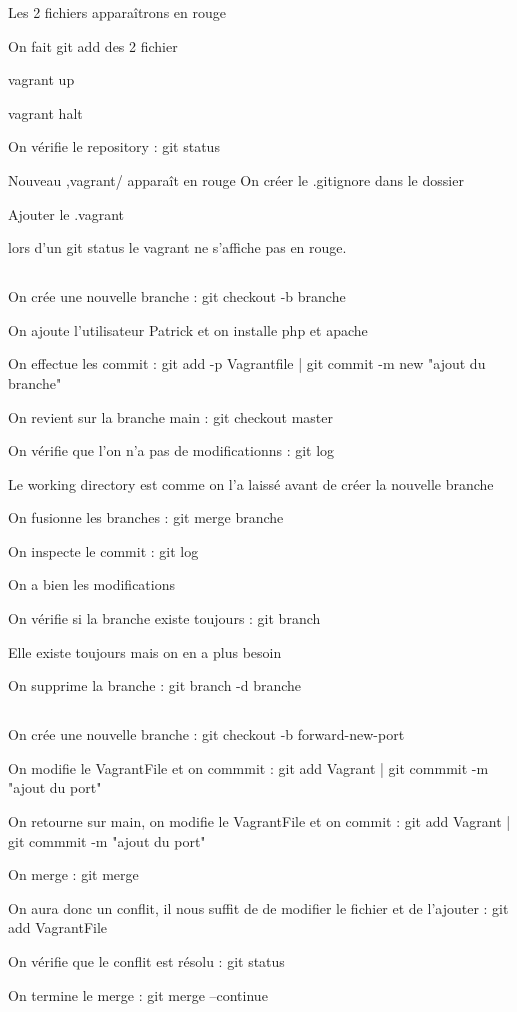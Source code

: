 \documentclass{article}
\begin{document}
Les 2 fichiers apparaîtrons en rouge

On fait git add des 2 fichier

vagrant up

vagrant halt

On vérifie le repository : git status 

Nouveau ,vagrant/ apparaît en rouge
On créer le .gitignore dans le dossier

Ajouter le .vagrant 

lors d’un git status le vagrant ne s’affiche pas en rouge.

\subsection{}

On crée une nouvelle branche : git checkout -b branche

On ajoute l'utilisateur Patrick et on installe php et apache

On effectue les commit : git add -p Vagrantfile | git commit -m new "ajout du branche"

On revient sur la branche main : git checkout master

On vérifie que l'on n'a pas de modificationns : git log

Le working directory est comme on l'a laissé avant de créer la nouvelle branche

On fusionne les branches : git merge branche

On inspecte le commit : git log

On a bien les modifications

On vérifie si la branche existe toujours : git branch

Elle existe toujours mais on en a plus besoin

On supprime la branche : git branch -d branche

\subsection{}

On crée une nouvelle branche : git checkout -b forward-new-port

On modifie le VagrantFile et on commmit : git add Vagrant | git commmit -m "ajout du port"

On retourne sur main, on modifie le VagrantFile et on commit : git add Vagrant | git commmit -m "ajout du port"

On merge : git merge

On aura donc un conflit, il nous suffit de de modifier le fichier et de l'ajouter : git add VagrantFile

On vérifie que le conflit est résolu : git status

On termine le merge : git merge --continue 

\subsection{}
\end{document}
